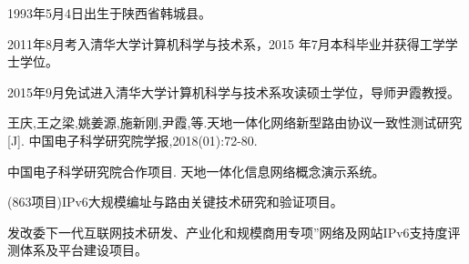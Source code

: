 \begin{resume}


  1993年5月4日出生于陕西省韩城县。

  2011年8月考入清华大学计算机科学与技术系，2015 年7月本科毕业并获得工学学士学位。

  2015年9月免试进入清华大学计算机科学与技术系攻读硕士学位，导师尹霞教授。


  \begin{publications}
    \item 王庆,王之梁,姚姜源,施新刚,尹霞,等.天地一体化网络新型路由协议一致性测试研究[J]. 中国电子科学研究院学报,2018(01):72-80.
  \end{publications}

%

  \begin{achievements}
    \item 中国电子科学研究院合作项目. 天地一体化信息网络概念演示系统。
    \item (863项目)IPv6大规模编址与路由关键技术研究和验证项目。
    \item 发改委下一代互联网技术研发、产业化和规模商用专项”网络及网站IPv6支持度评测体系及平台建设项目。
  \end{achievements}

\end{resume}
